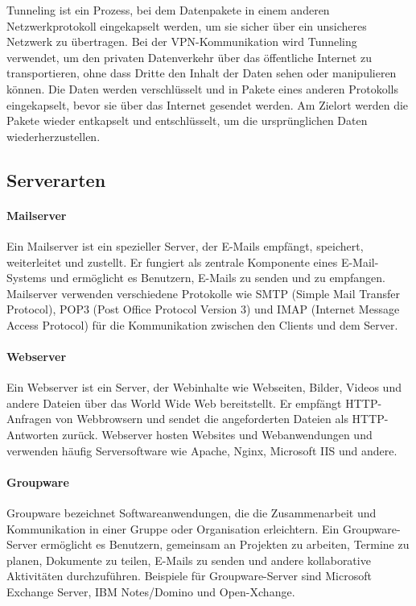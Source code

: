 Tunneling ist ein Prozess, bei dem Datenpakete in einem anderen Netzwerkprotokoll eingekapselt werden, um sie sicher über ein unsicheres Netzwerk zu übertragen. Bei der VPN-Kommunikation wird Tunneling verwendet, um den privaten Datenverkehr über das öffentliche Internet zu transportieren, ohne dass Dritte den Inhalt der Daten sehen oder manipulieren können. Die Daten werden verschlüsselt und in Pakete eines anderen Protokolls eingekapselt, bevor sie über das Internet gesendet werden. Am Zielort werden die Pakete wieder entkapselt und entschlüsselt, um die ursprünglichen Daten wiederherzustellen.

\subsection{Serverarten}

\paragraph{Mailserver}

Ein Mailserver ist ein spezieller Server, der E-Mails empfängt, speichert, weiterleitet und zustellt. Er fungiert als zentrale Komponente eines E-Mail-Systems und ermöglicht es Benutzern, E-Mails zu senden und zu empfangen. Mailserver verwenden verschiedene Protokolle wie SMTP (Simple Mail Transfer Protocol), POP3 (Post Office Protocol Version 3) und IMAP (Internet Message Access Protocol) für die Kommunikation zwischen den Clients und dem Server.

\paragraph{Webserver}

Ein Webserver ist ein Server, der Webinhalte wie Webseiten, Bilder, Videos und andere Dateien über das World Wide Web bereitstellt. Er empfängt HTTP-Anfragen von Webbrowsern und sendet die angeforderten Dateien als HTTP-Antworten zurück. Webserver hosten Websites und Webanwendungen und verwenden häufig Serversoftware wie Apache, Nginx, Microsoft IIS und andere.

\paragraph{Groupware}

Groupware bezeichnet Softwareanwendungen, die die Zusammenarbeit und Kommunikation in einer Gruppe oder Organisation erleichtern. Ein Groupware-Server ermöglicht es Benutzern, gemeinsam an Projekten zu arbeiten, Termine zu planen, Dokumente zu teilen, E-Mails zu senden und andere kollaborative Aktivitäten durchzuführen. Beispiele für Groupware-Server sind Microsoft Exchange Server, IBM Notes/Domino und Open-Xchange.

